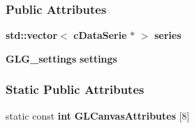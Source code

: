 \subsubsection*{Public Attributes}
\begin{DoxyCompactItemize}
\item 
{\bf std\+::vector}$<$ {\bf c\+Data\+Serie} $\ast$ $>$ {\bf series}
\item 
{\bf G\+L\+G\+\_\+settings} {\bf settings}
\end{DoxyCompactItemize}
\subsubsection*{Static Public Attributes}
\begin{DoxyCompactItemize}
\item 
static const {\bf int} {\bf G\+L\+Canvas\+Attributes} [8]
\end{DoxyCompactItemize}
